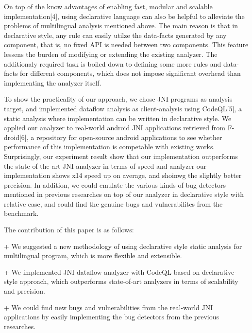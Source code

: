 On top of the know advantages of enabling fast, modular and scalable
implementation[4], using declarative language can also be helpful to alleviate
the problems of multilingual analysis mentioned above. The main reason is that
in declarative style, any rule can easily utilze the data-facts generated by
any component, that is, no fixed API is needed between two components.  This
feature lessens the burden of modifying or extending the existing analyzer.
The additionaly required task is boiled down to defining some more rules and
data-facts for different components, which does not impose significant overhead
than implementing the analyzer itself.

To show the practicality of our approach, we chose JNI programs as analysis
target, and implemented dataflow analysis as client-analysis using CodeQL[5], a
static analysis where implementation can be written in declarative style. We
applied our analyzer to real-world android JNI applications retrieved from
F-droid[6], a repository for open-source android applications to see whether
performance of this implementation is competable with existing works.
Surprisingly, our experiment result show that our implementation outperforms
the state of the art JNI analyzer in terms of speed and analyzer our
implementation shows x14 speed up on average, and shoinwg the slightly better
precision. In addition, we could emulate the various kinds of bug detectors
mentioned in previous researches on top of our analyzer in declarative style
with relative ease, and could find the genuine bugs and vulnerabilites from the
benchmark.

The contribution of this paper is as follows:

+ We suggested a new methodology of using declarative style static analysis
for multilingual program, which is more flexible and extensible.

+ We implemented JNI dataflow analyzer with CodeQL based on declarative-style approach,
which outperforms state-of-art analyzers in terms of scalability and precision.

+ We could find new bugs and vulnerabilities from the real-world JNI applications
by easily implementing the bug detectors from the previous researches.
